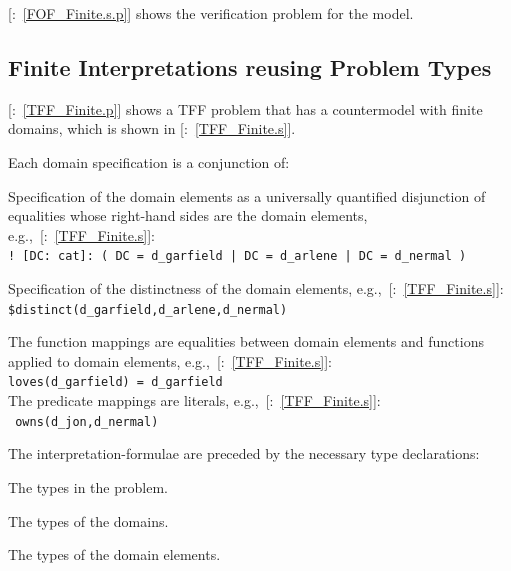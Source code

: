 \documentclass{easychair}
\newcommand{\smalltt}[1]{\small \texttt{#1}}
\newcommand{\example}{{\scriptsize \faFile[regular]}}
\newcommand{\tildenot}{\raisebox{0.4ex}{\texttildelow}}
\newenvironment{packed_itemize}{
\vspace*{-0.3em}
\begin{itemize}
\setlength{\partopsep}{0pt}
\setlength{\itemsep}{1pt}
\setlength{\parskip}{0pt}
\setlength{\parsep}{0pt}
}{\end{itemize}}
\begin{document}
[\example{}:~\ref{FOF_Finite.s.p}] shows the verification problem for the model.

\subsection{Finite Interpretations reusing Problem Types}
\label{TarskianReusingTypes}

[\example{}:~\ref{TFF_Finite.p}] shows a TFF problem that has a countermodel with finite domains,
which is shown in [\example{}:~\ref{TFF_Finite.s}].

Each domain specification is a conjunction of:
\begin{packed_itemize}
\item Specification of the domain elements as a universally quantified disjunction of equalities 
      whose right-hand sides are the domain elements, e.g.,~[\example{}:~\ref{TFF_Finite.s}]:\\
      \hspace*{0.5cm}\smalltt{! [DC: cat]: ( DC = d\_garfield | DC = d\_arlene | DC = d\_nermal )}
\item Specification of the distinctness of the domain elements, 
e.g.,~[\example{}:~\ref{TFF_Finite.s}]:\\
      \hspace*{0.5cm}\smalltt{\$distinct(d\_garfield,d\_arlene,d\_nermal)}
\end{packed_itemize}

The function mappings are equalities between domain elements and functions applied to domain 
elements, e.g.,~[\example{}:~\ref{TFF_Finite.s}]: \\
\hspace*{0.5cm}\smalltt{loves(d\_garfield) = d\_garfield}\\
The predicate mappings are literals, e.g.,~[\example{}:~\ref{TFF_Finite.s}]: \\
\hspace*{0.5cm}\smalltt{\tildenot{}\,owns(d\_jon,d\_nermal)}

The interpretation-formulae are preceded by the necessary type declarations:
\begin{packed_itemize}
\item The types in the problem.
\item The types of the domains.
\item The types of the domain elements.
\end{packed_itemize}
\end{document}
